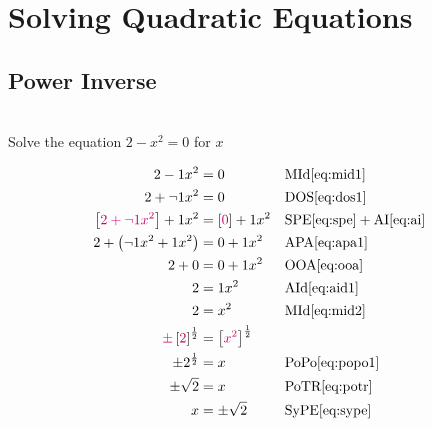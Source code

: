 \documentclass[20150903-160354-rs2.2-MarksMathNotebook.tex]{subfiles}
\begin{document}
%
%

\chapter{Solving Quadratic Equations}

\section{Power Inverse}
\begin{example}[id:20141107-131748] \label{20141107-131748}  \hfill \\

Solve the equation $2-x^2=0$ for $x$

\soln

\solnsteps
\begin{align*}
2-1x^2 &= 0 && \text{MId} \eqref{eq:mid1} \\
2+\neg 1 x^2 &= 0 && \text{DOS} \eqref{eq:dos1} \\
\left[\alert{2+\neg 1x^2} \right] + 1x^2 &= \left[\alert{0}\right]+ 1x^2 && \text{SPE} \eqref{eq:spe} + \text{AI} \eqref{eq:ai} \\
2 + \left(\neg 1x^2 + 1x^2 \right) &= 0 + 1x^2 && \text{APA} \eqref{eq:apa1} \\
2 + 0 &= 0 + 1x^2 && \text{OOA} \eqref{eq:ooa} \\
2 &= 1x^2 && \text{AId} \eqref{eq:aid1} \\
2 &= x^2 && \text{MId} \eqref{eq:mid2} \\
\alert{\pm} \left[\alert{2} \right]^{\frac{1}{2}} &= \left[\alert{x^2}\right]^{\frac{1}{2}} \\ %
\pm 2^{\frac{1}{2}} &= x && \text{PoPo} \eqref{eq:popo1} \\
\pm \sqrt{2} &= x && \text{PoTR} \eqref{eq:potr} \\
x &= \pm \sqrt{2} && \text{SyPE} \eqref{eq:sype}
\end{align*}
\end{example}
\end{document}
